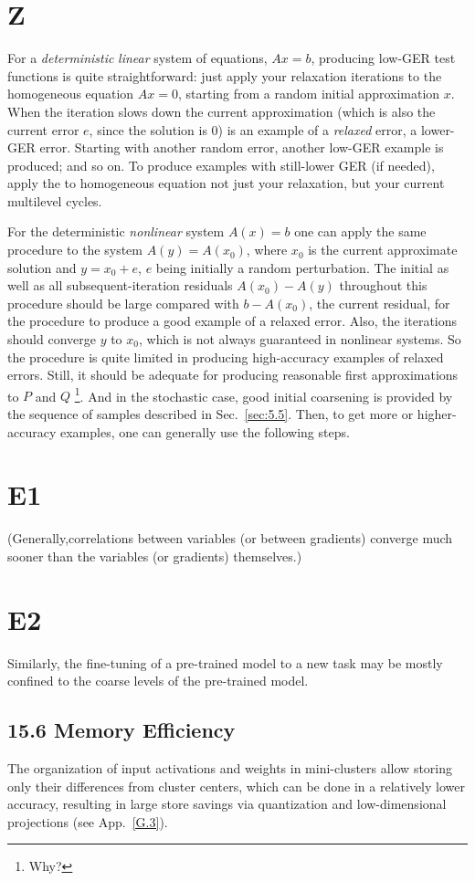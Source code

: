 \documentclass{article} %
\begin{document}
\section{Z}
For a {\it deterministic} {\it linear} system of equations, $Ax = b$, producing low-GER test functions is quite straightforward: just apply your relaxation iterations to the homogeneous equation $Ax = 0$, starting from a random initial approximation $x$. When the iteration slows down the current approximation (which is also the current error $e$, since the solution is $0$) is an example of a {\it relaxed} error, a lower-GER error. Starting with another random error, another low-GER example is produced; and so on. To produce examples with still-lower GER (if needed), apply the to homogeneous equation not just your relaxation, but your current multilevel cycles.

For the deterministic {\it nonlinear} system $A(x) = b$ one can apply the same procedure to the system $A(y) = A(x_0)$, where $x_0$ is the current approximate solution and $y = x_0 + e$, $e$ being initially a random perturbation. The initial as well as all subsequent-iteration residuals $A(x_0) - A(y)$  throughout this procedure should be large compared with $b - A(x_0)$, the current residual, for the procedure to produce a good example of a relaxed error. Also, the iterations should converge $y$ to $x_0$, which is not always guaranteed in nonlinear systems. So the procedure is quite limited in producing high-accuracy examples of relaxed errors. Still, it should be adequate for producing reasonable first approximations to $P$ and $Q$ \footnote{Why?}. And in the stochastic case, good initial coarsening is provided by the sequence of samples described in Sec.~\ref{sec:5.5}. Then, to get more or higher-accuracy examples, one can generally use the following steps.

\section{E1}
(Generally,correlations between variables (or between gradients) converge much sooner than the variables (or gradients) themselves.)

\section{E2}
Similarly, the fine-tuning of a pre-trained model to a new task may be mostly confined to the coarse levels of the pre-trained model.

\subsection{15.6 Memory Efficiency}
The organization of input activations and weights in mini-clusters allow storing only their differences from cluster centers, which can be done in a relatively lower accuracy, resulting in large store savings via quantization and low-dimensional projections (see App.~\ref{G.3}).
\end{document}
